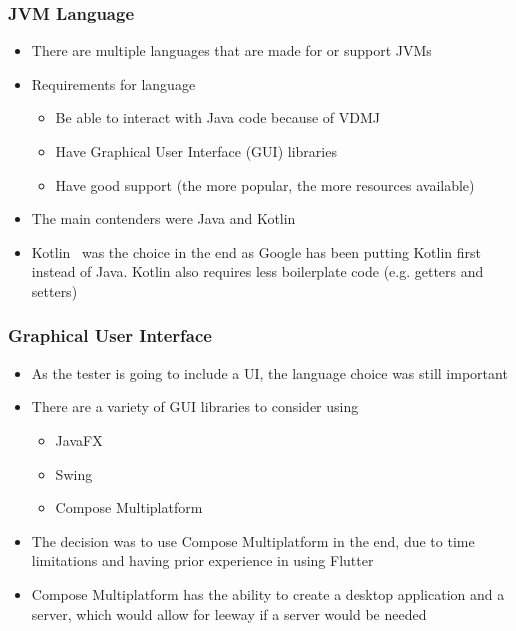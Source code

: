 \documentclass[../dissertation.tex]{subfiles}
\begin{document}
\subsubsection{JVM Language}
\begin{itemize}
  \item There are multiple languages that are made for or support JVMs~\cite{jvm-alt-lang}
  \item Requirements for language
    \begin{itemize}
      \item Be able to interact with Java code because of VDMJ
      \item Have Graphical User Interface (GUI) libraries
      \item Have good support (the more popular, the more resources available)
    \end{itemize}
  \item The main contenders were Java and Kotlin~\cite{kotlin}
  \item Kotlin~\cite{kotlin} was the choice in the end as Google has been putting Kotlin first
    instead of Java. Kotlin also requires less boilerplate code (e.g. getters and setters)~\cite{android-kotlin}

\end{itemize}

\subsubsection{Graphical User Interface}
\begin{itemize}
  \item As the tester is going to include a UI, the language choice was still important
    \item There are a variety of GUI libraries to consider using
    \begin{itemize}
      \item JavaFX~\cite{javafx}
      \item Swing~\cite{flatlaf}
      \item Compose Multiplatform~\cite{compose}
    \end{itemize}
  \item The decision was to use Compose Multiplatform in the end, due to time limitations and
    having prior experience in using Flutter~\cite{flutter}
  \item Compose Multiplatform has the ability to create a desktop application and a server,
    which would allow for leeway if a server would be needed
\end{itemize}
\end{document}

